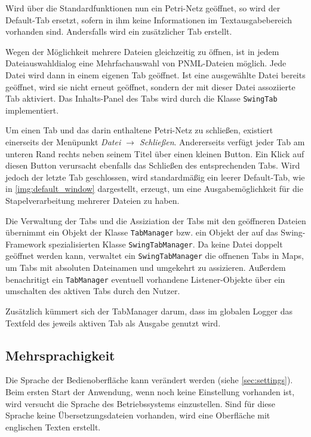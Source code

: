 Wird über die Standardfunktionen nun ein Petri-Netz geöffnet, so wird der
Default-Tab ersetzt, sofern in ihm keine Informationen im Textausgabebereich
vorhanden sind. Andersfalls wird ein zusätzlicher Tab erstellt.

Wegen der Möglichkeit mehrere Dateien gleichzeitig zu öffnen, ist in jedem
Dateiauswahldialog eine Mehrfachauswahl von PNML-Dateien möglich. Jede Datei
wird dann in einem eigenen Tab geöffnet. Ist eine ausgewählte Datei bereits
geöffnet, wird sie nicht erneut geöffnet, sondern der mit dieser Datei
assoziierte Tab aktiviert. Das Inhalts-Panel des Tabs wird durch die Klasse
\texttt{SwingTab} implementiert.

Um einen Tab und das darin enthaltene Petri-Netz zu schließen, existiert
einerseits der Menüpunkt \emph{Datei $\rightarrow$ Schließen}. Andererseits
verfügt jeder Tab am unteren Rand rechts neben seinem Titel über einen kleinen
Button. Ein Klick auf diesen Button verursacht ebenfalls das Schließen des
entsprechenden Tabs. Wird jedoch der letzte Tab geschlossen, wird standardmäßig
ein leerer Default-Tab, wie in \cref{img:default_window} dargestellt, erzeugt,
um eine Ausgabemöglichkeit für die Stapelverarbeitung mehrerer Dateien zu haben.

Die Verwaltung der Tabs und die Assiziation der Tabs mit den geöffneren Dateien
übernimmt ein Objekt der Klasse \texttt{TabManager} bzw. ein Objekt der auf das
Swing-Framework spezialisierten Klasse \texttt{SwingTabManager}. Da keine Datei
doppelt geöffnet werden kann, verwaltet ein \texttt{SwingTabManager} die
offnenen Tabs in Maps, um Tabs mit absoluten Dateinamen und umgekehrt zu
assizieren. Außerdem benachritigt ein \texttt{TabManager} eventuell vorhandene
Listener-Objekte über ein umschalten des aktiven Tabs durch den Nutzer.

Zusätzlich kümmert sich der TabManager darum, dass im globalen Logger das
Textfeld des jeweils aktiven Tab als Ausgabe genutzt wird.

\subsection{Mehrsprachigkeit}
Die Sprache der Bedienoberfläche kann verändert werden (siehe
\cref{sec:settings}). Beim ersten Start der Anwendung, wenn noch keine
Einstellung vorhanden ist, wird versucht die Sprache des Betriebssystems
einzustellen. Sind für diese Sprache keine Übersetzungsdateien vorhanden, wird
eine Oberfläche mit englischen Texten erstellt.

